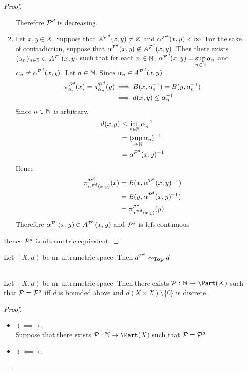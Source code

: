 \documentclass{book}
\begin{document}
\begin{proof}
\begin{enumerate}
		Therefore $\mathcal{P}^d$ is decreasing.
		\item Let $x,y \in X$. Suppose that $A^{\mathcal{P}^d}(x,y) \neq \varnothing$ and $\alpha^{\mathcal{P}^d}(x,y) < \infty$. For the sake of contradiction, suppose that $\alpha^{\mathcal{P}^d}(x,y) \not \in A^{\mathcal{P}^d}(x,y)$. Then there exists $(\alpha_n)_{n \in \mathbb{N}} \subset A^{\mathcal{P}^d}(x,y)$ such that for each $n \in \mathbb{N}$, $\alpha^{\mathcal{P}^d}(x,y) = \sup\limits_{n \in \mathbb{N}} \alpha_n$ and $\alpha_n \neq \alpha^{\mathcal{P}^d}(x,y)$. Let $n \in \mathbb{N}$. Since $\alpha_n \in A^{\mathcal{P}^d}(x,y)$, 
		\begin{align*}
			\pi^{\mathcal{P}^d}_{\alpha_n}(x) = \pi^{\mathcal{P}^d}_{\alpha_n}(y)
			& \implies \bar{B}(x, \alpha_n^{-1}) = \bar{B}(y, \alpha_n^{-1}) \\
			& \implies d(x,y) \leq \alpha_n^{-1}
		\end{align*}
		Since $n \in \mathbb{N}$ is arbitrary, 
		\begin{align*}
			d(x,y)
			& \leq \inf_{n \in \mathbb{N}} \alpha_n^{-1} \\
			& = (\sup_{n \in \mathbb{N}} \alpha_n)^{-1} \\
			& = \alpha^{\mathcal{P}^d}(x,y)^{-1} 
		\end{align*}
		Hence 
		\begin{align*}
			\pi^{\mathcal{P}^d}_{\alpha^{\mathcal{P}^d}(x,y)}(x)
			& = \bar{B}(x, \alpha^{\mathcal{P}^d}(x,y)^{-1}) \\
			& = \bar{B}(y, \alpha^{\mathcal{P}^d}(x,y)^{-1}) \\
			& = \pi^{\mathcal{P}^d}_{\alpha^{\mathcal{P}^d}(x,y)}(y)
		\end{align*}
		Therefore $\alpha^{\mathcal{P}^d}(x,y) \in A^{\mathcal{P}^d}(x,y)$ and $\mathcal{P}^d$ is left-continuous
	\end{enumerate}
	Hence $\mathcal{P}^d$ is ultrametric-equivalent.
\end{proof}

\begin{ex}
	Let $(X, d)$ be an ultrametric space. Then $d^{\mathcal{P}^d} \sim_{\operatorname*{\text{\textbf{Top}}}} d$. \\
\end{ex}



\begin{ex}  \\
	Let $(X, d)$ be an ultrametric space. Then there exists $\MP: \N \rightarrow \Part(X)$ such that $\bar{\mathcal{P}} = \mathcal{P}^d$ iff $d$ is bounded above and $d(X \times X) \setminus \{0\}$ is discrete. 
\end{ex}

\begin{proof}\
	\begin{itemize}
	 	\item $(\implies): $ \\
	 	Suppose that there exists $\MP: \N \rightarrow \Part(X)$ such that $\bar{\mathcal{P}} = \mathcal{P}^d$ 
	 	\item $(\impliedby): $ \\
	\end{itemize}
\end{proof}
\end{document}
